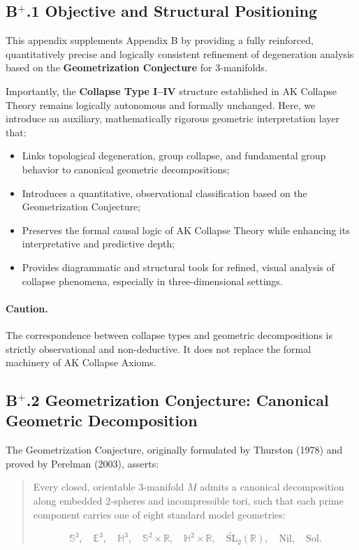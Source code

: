 \documentclass[11pt]{article}
\begin{document}
\subsection*{B$^{+}$.1 Objective and Structural Positioning}

This appendix supplements Appendix B by providing a fully reinforced, quantitatively precise and logically consistent refinement of degeneration analysis based on the \textbf{Geometrization Conjecture} for $3$-manifolds.

Importantly, the \textbf{Collapse Type I–IV} structure established in AK Collapse Theory remains logically autonomous and formally unchanged. Here, we introduce an auxiliary, mathematically rigorous geometric interpretation layer that:

\begin{itemize}
    \item Links topological degeneration, group collapse, and fundamental group behavior to canonical geometric decompositions;
    \item Introduces a quantitative, observational classification based on the Geometrization Conjecture;
    \item Preserves the formal causal logic of AK Collapse Theory while enhancing its interpretative and predictive depth;
    \item Provides diagrammatic and structural tools for refined, visual analysis of collapse phenomena, especially in three-dimensional settings.
\end{itemize}

\paragraph{Caution.}  
The correspondence between collapse types and geometric decompositions is strictly observational and non-deductive. It does not replace the formal machinery of AK Collapse Axioms.

\subsection*{B$^{+}$.2 Geometrization Conjecture: Canonical Geometric Decomposition}

The Geometrization Conjecture, originally formulated by Thurston (1978) and proved by Perelman (2003), asserts:

\begin{quote}
Every closed, orientable $3$-manifold $M$ admits a canonical decomposition along embedded $2$-spheres and incompressible tori, such that each prime component carries one of eight standard model geometries:

\[
\mathbb{S}^3,\quad \mathbb{E}^3,\quad \mathbb{H}^3,\quad \mathbb{S}^2 \times \mathbb{R},\quad \mathbb{H}^2 \times \mathbb{R},\quad \widetilde{\mathrm{SL}}_2(\mathbb{R}),\quad \mathrm{Nil},\quad \mathrm{Sol}.
\]
\end{quote}
\end{document}
